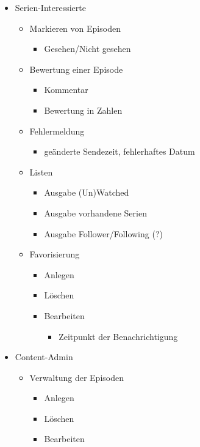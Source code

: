 \begin{itemize}
\item
Serien-Interessierte
  \begin{itemize}
  \item
    Markieren von Episoden
      \begin{itemize}
      \item
      Gesehen/Nicht gesehen
      \end{itemize}
    \item
    Bewertung einer Episode
        \begin{itemize}
        \item
        Kommentar
        \item
        Bewertung in Zahlen
        \end{itemize}
     \item
     Fehlermeldung
      \begin{itemize}
      \item
        geänderte Sendezeit, fehlerhaftes Datum
        \end{itemize}
     \item
     Listen
      \begin{itemize}
      \item
      Ausgabe (Un)Watched
      \item
      Ausgabe vorhandene Serien
      \item
      Ausgabe Follower/Following (?)
      \end{itemize}
     \item
     Favorisierung
        \begin{itemize}
        \item
        Anlegen
        \item
        Löschen
        \item
        Bearbeiten
          \begin{itemize}
          \item
            Zeitpunkt der Benachrichtigung
            \end{itemize}
    \end{itemize}
  \end{itemize}
  \item
  Content-Admin
    \begin{itemize}
    \item
    Verwaltung der Episoden
      \begin{itemize}
      \item
      Anlegen
      \item
      Löschen
      \item
      Bearbeiten
      \end{itemize}
    \end{itemize}
\end{itemize}


